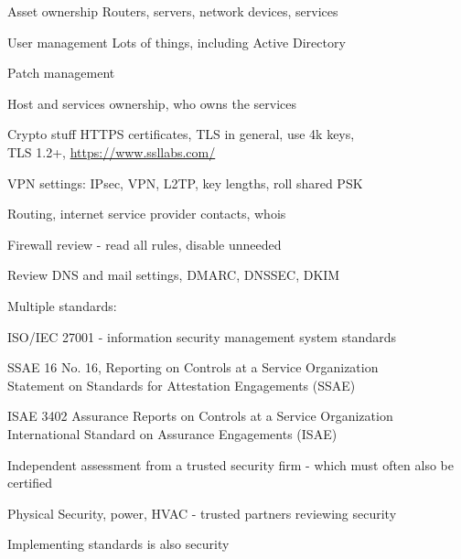 \documentclass[20pt,landscape,a4paper,footrule]{foils}
\begin{document}

\begin{list1}
\item Asset ownership
Routers, servers, network devices, services
\item User management
Lots of things, including Active Directory
\item Patch management
\item Host and services ownership, who owns the services
\end{list1}


\begin{list1}
\item Crypto stuff
HTTPS certificates, TLS in general, use 4k keys, \\
TLS 1.2+, \url{https://www.ssllabs.com/}
\item VPN settings: IPsec, VPN, L2TP, key lengths, roll shared PSK
\item Routing, internet service provider contacts, whois
\item Firewall review - read all rules, disable unneeded
\item Review DNS and mail settings, DMARC, DNSSEC, DKIM
\end{list1}



Multiple standards:
\begin{list2}
\item ISO/IEC 27001 - information security management system standards\\
\item SSAE 16 No. 16, Reporting on Controls at a Service Organization\\
Statement on Standards for Attestation Engagements (SSAE) 
\item ISAE 3402 Assurance Reports on Controls at a Service Organization\\
International Standard on Assurance Engagements (ISAE)
\item Independent assessment from a trusted security firm - which must often also be certified
\item Physical Security, power, HVAC - trusted partners reviewing security
\item Implementing standards is also security
\end{list2}
\end{document}
